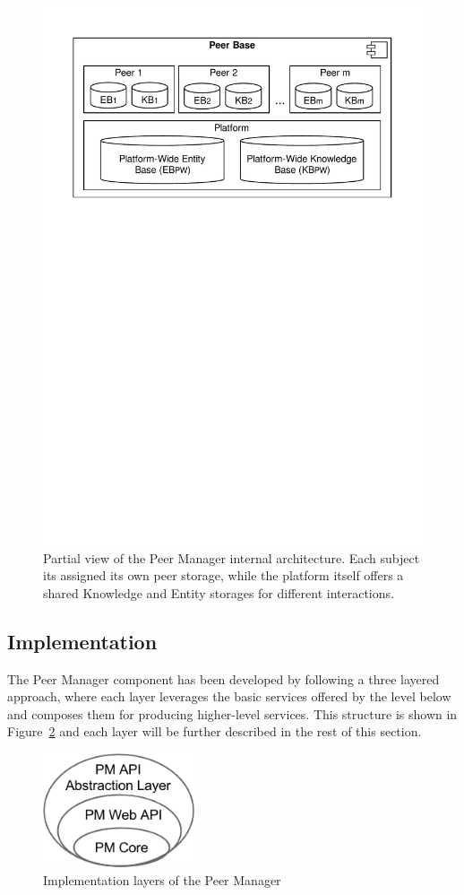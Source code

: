 \begin{figure}[t]
	\centering
	\includegraphics[width=0.7\linewidth]{figures/peerBase-diagram.pdf}
	\caption{Partial view of the Peer Manager internal architecture. Each subject its assigned its own peer storage, while the platform itself offers a shared Knowledge and Entity storages for different interactions.}
	\label{fig:peerManagerPlatform}
\end{figure}




\subsection{Implementation}

The Peer Manager component has been developed by following a three layered approach, where each layer leverages the basic services offered by the level below and composes them for producing higher-level services. This structure is shown in Figure~\ref{fig:pm-component-layers} and each layer will be further described in the rest of this section. 

\begin{figure}[htbp]
\centering
\includegraphics[width=0.4\textwidth]{figures/pm-component-layers.png}
\caption{Implementation layers of the Peer Manager}
\label{fig:pm-component-layers}
\end{figure}


